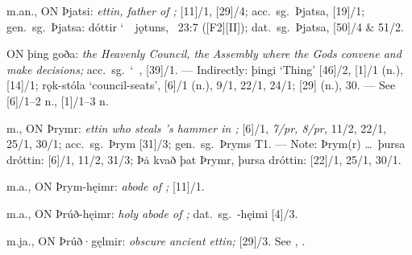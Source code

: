 \begin{itemize}
 m.an., ON Þjatsi:
  \emph{ettin, father of ;} [11]/1, [29]/4; acc.~sg.~Þjatsa, [19]/1; gen.~sg.~Þjatsa: dóttir \char`~\ jǫtuns, \Gylfaginning~23:7 ([F2][II]); dat.~sg.~Þjatsa, [50]/4 \& 51/2.

 ON þing goða:
  \emph{the Heavenly Council, the Assembly where the Gods convene and make decisions;} acc.~sg.~\char`~, [39]/1. --- Indirectly: þingi ‘Thing’ [46]/2, [1]/1 (n.), [14]/1; rǫk-stóla ‘council-seats’, [6]/1 (n.), 9/1, 22/1, 24/1; [29] (n.), 30. --- See [6]/1--2 n., [1]/1--3 n.

 m., ON Þrymr:
  \emph{ettin who steals ’s hammer in ;} [6]/1, \emph{7/pr, 8/pr,} 11/2, 22/1, 25/1, 30/1; acc.~sg.~Þrym [31]/3; gen.~sg.~Þryms  T1. --- Note: Þrym(r) \dots\ þursa dróttin: [6]/1, 11/2, 31/3; Þȧ kvað þat Þrymr, þursa dróttin: [22]/1, 25/1, 30/1.

 m.a., ON Þrym-hęimr:
  \emph{abode of ;} [11]/1.

 m.a., ON Þrúð-hęimr:
  \emph{holy abode of ;} dat.~sg.~-hęimi [4]/3.

 m.ja., ON Þrúð·gęlmir:
  \emph{obscure ancient ettin;} [29]/3.  See , .


\end{itemize}
